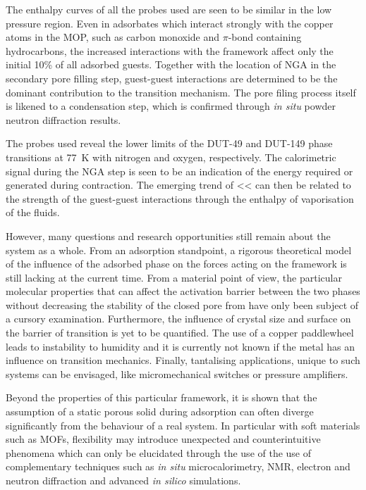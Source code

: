 The enthalpy curves of all the probes used are seen to 
be similar in the low pressure region. Even in adsorbates which interact 
strongly with the copper atoms in the MOP, such as carbon monoxide and 
\(\pi\)-bond containing hydrocarbons, the increased interactions with the 
framework affect only the initial 10\% of all adsorbed guests. Together
with the location of NGA in the secondary pore filling step,
guest-guest interactions are determined to be the dominant contribution 
to the transition mechanism. The pore filing process itself is likened
to a condensation step, which is confirmed through \textit{in situ}
powder neutron diffraction results.

The probes used reveal the lower limits of the DUT-49
and DUT-149 phase transitions at \SI{77}{\kelvin} with nitrogen and 
oxygen, respectively. The calorimetric signal during the NGA step
is seen to be an indication of the energy required or generated 
during contraction. The emerging trend of <<
can then be related to the strength of the guest-guest interactions
through the enthalpy of vaporisation of the fluids.

However, many questions and research opportunities still remain about the 
system as a whole. From an adsorption standpoint, a rigorous theoretical 
model of the influence of the adsorbed phase on the forces acting on the
framework is still lacking at the current time.
From a material point of view, the particular molecular properties that 
can affect the activation barrier between the two phases without 
decreasing the stability of the closed pore from have only been 
subject of a cursory examination.
Furthermore, the influence of crystal size and surface on the
barrier of transition is yet to be quantified. The use of a copper 
paddlewheel leads to instability to humidity and it is currently
not known if the metal has an influence on transition mechanics.
Finally, tantalising applications, unique to such systems can be 
envisaged, like micromechanical switches or pressure amplifiers.

Beyond the properties of this particular framework, it is shown that 
the assumption of a static porous solid during adsorption can often
diverge significantly from the behaviour of a real system. In particular
with soft materials such as MOFs, flexibility may introduce 
unexpected and counterintuitive phenomena which can only be elucidated 
through the use of the use of complementary techniques such as 
\textit{in situ} microcalorimetry, NMR, electron and neutron diffraction 
and advanced \textit{in silico} simulations.

\FloatBarrier%
\pagebreak